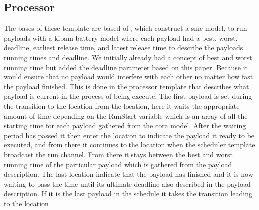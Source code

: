 \subsection{Processor}
The bases of these template are based of \cite{battery_aware_scheduling}, which construct a \gls{smc} model, to run payloads with a \gls{kibam} battery model where each payload had a best, worst, deadline, earliest release time, and latest release time to describe the payloads running times and deadline. We initially already had a concept of best and worst running time but added the deadline parameter based on this paper. Because it would ensure that no payload would interfere with each other no matter how fast the payload finished. This is done in the processor template that describes what payload is current in the process of being execute. The first payload is set during the transition to the  location from the  location, here it waits the appropriate amount of time depending on the RunStart variable which is an array of all the starting time for each payload gathered from the \gls{cora} model. After the waiting period has passed it then enter the  location to indicate the payload it ready to be executed, and from there it continues to the  location when the scheduler template broadcast the run channel. From there it stays between the best and worst running time of the particular payload which is gathered from the payload description. The last location  indicate that the payload has finished and it is now waiting to pass the time until its ultimate deadline also described in the payload description. If it is the last payload in the schedule it takes the transition leading to the location .


